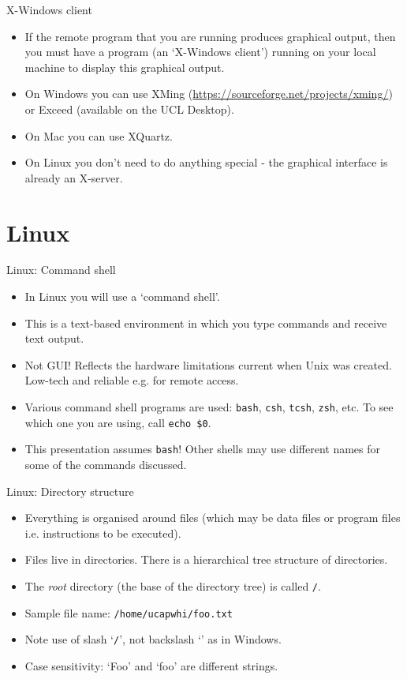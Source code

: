 \documentclass{beamer}
\newcommand{\command}[1]{\colorbox{light-gray}{\texttt{#1}}}
\newcommand{\filename}[1]{\colorbox{light-green}{\texttt{#1}}}
\begin{document}
\begin{frame}{X-Windows client}
  \begin{itemize}
    \item If the remote program that you are running produces graphical output, then you must have a program (an `X-Windows client') running on your local machine to display this graphical output.
    \item On Windows you can use XMing (\url{https://sourceforge.net/projects/xming/}) or Exceed (available on the UCL Desktop).
    \item On Mac you can use XQuartz.
    \item On Linux you don't need to do anything special - the graphical interface is already an X-server.
  \end{itemize}
\end{frame}


\section{Linux}

\begin{frame}{Linux: Command shell}
  \begin{itemize}
    \item{In Linux you will use a `command shell'.}
    \item{This is a text-based environment in which you type commands and receive text output.}
    \item{Not GUI! Reflects the hardware limitations current when Unix was created. Low-tech and reliable e.g. for remote access.}
    \item{Various command shell programs are used: \command{bash}, \command{csh}, \command{tcsh}, \command{zsh}, etc. To see which one you are using, call \command{echo \$0}.}
    \item{This presentation assumes \command{bash}! Other shells may use different names for some of the commands discussed.}
   \end{itemize}
\end{frame}

\begin{frame}{Linux: Directory structure}
  \begin{itemize}
    \item{Everything is organised around files (which may be data files or program files i.e. instructions to be executed).}
    \item{Files live in directories. There is a hierarchical tree structure of directories.}
    \item{The \textit{root} directory (the base of the directory tree) is called \filename{/}}.
    \item{Sample file name: \filename{/home/ucapwhi/foo.txt}}
    \item{Note use of slash `\texttt{/}', not backslash `\texttt{}' as in Windows.}
    \item{Case sensitivity: `Foo' and `foo' are different strings.}
  \end{itemize}
\end{frame}
\end{document}

